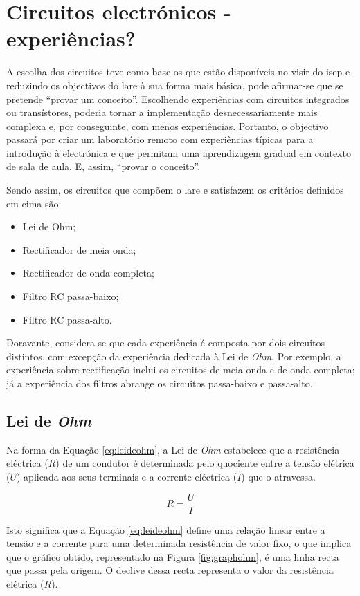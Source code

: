 \section{Circuitos electrónicos - experiências?}
\label{sec:circuitos}
A escolha dos circuitos teve como base os que estão disponíveis no \acrshort{visir} do \acrshort{isep} e reduzindo os objectivos do \acrshort{lare} à sua forma mais básica, pode afirmar-se que se pretende ``provar um conceito''. Escolhendo experiências com circuitos integrados ou transístores, poderia tornar a implementação desnecessariamente mais complexa e, por conseguinte, com menos experiências. Portanto, o objectivo passará por criar um \acrshort{laboratório remoto} com experiências típicas para a introdução à electrónica e que permitam uma aprendizagem gradual em contexto de sala de aula. E, assim, ``provar o conceito''.

Sendo assim, os circuitos que compõem o \acrshort{lare} e satisfazem os critérios definidos em cima são:
\begin{itemize}
    \item Lei de Ohm;
    \item Rectificador de meia onda;
    \item Rectificador de onda completa;
    \item Filtro RC passa-baixo;
    \item Filtro RC passa-alto.
\end{itemize}

Doravante, considera-se que cada experiência é composta por dois circuitos distintos, com excepção da experiência dedicada à Lei de \textit{Ohm}. Por exemplo, a experiência sobre rectificação inclui os circuitos de meia onda e de onda completa; já a experiência dos filtros abrange os circuitos passa-baixo e passa-alto.

\subsection{Lei de \textit{Ohm}}
Na forma da Equação \ref{eq:leideohm}, a Lei de \textit{Ohm} estabelece que a resistência eléctrica ($R$) de um condutor é determinada pelo quociente entre a tensão elétrica ($U$) aplicada aos seus terminais e a corrente eléctrica ($I$) que o atravessa.  

\begin{equation} \label{eq:leideohm}
	R=\dfrac{U}{I}
\end{equation}

Isto significa que a Equação \ref{eq:leideohm} define uma relação linear entre a tensão e a corrente para uma determinada resistência de valor fixo, o que implica que o gráfico obtido, representado na Figura \ref{fig:graphohm}, é uma linha recta que passa pela origem. O declive dessa recta representa o valor da resistência elétrica ($R$).

